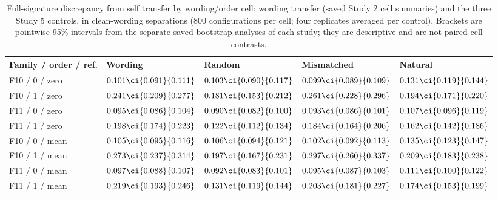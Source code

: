 \begin{table}[H]
\centering\footnotesize
\setlength{\tabcolsep}{3pt}
\caption{Full-signature discrepancy from self transfer by wording/order cell: wording transfer (saved Study 2 cell summaries) and the three Study 5 controls, in clean-wording separations (800 configurations per cell; four replicates averaged per control). Brackets are pointwise 95\% intervals from the separate saved bootstrap analyses of each study; they are descriptive and are not paired cell contrasts.}
\label{tab:null-cell-comparison}
\begin{tabularx}{\linewidth}{@{}lYYYY@{}}
\toprule
Family / order / ref. & Wording & Random & Mismatched & Natural \\
\midrule
F10 / 0 / zero & $0.101\ci{0.091}{0.111}$ & $0.103\ci{0.090}{0.117}$ & $0.099\ci{0.089}{0.109}$ & $0.131\ci{0.119}{0.144}$ \\
F10 / 1 / zero & $0.241\ci{0.209}{0.277}$ & $0.181\ci{0.153}{0.212}$ & $0.261\ci{0.228}{0.296}$ & $0.194\ci{0.171}{0.220}$ \\
F11 / 0 / zero & $0.095\ci{0.086}{0.104}$ & $0.090\ci{0.082}{0.100}$ & $0.093\ci{0.086}{0.101}$ & $0.107\ci{0.096}{0.119}$ \\
F11 / 1 / zero & $0.198\ci{0.174}{0.223}$ & $0.122\ci{0.112}{0.134}$ & $0.184\ci{0.164}{0.206}$ & $0.162\ci{0.142}{0.186}$ \\
F10 / 0 / mean & $0.105\ci{0.095}{0.116}$ & $0.106\ci{0.094}{0.121}$ & $0.102\ci{0.092}{0.113}$ & $0.135\ci{0.123}{0.147}$ \\
F10 / 1 / mean & $0.273\ci{0.237}{0.314}$ & $0.197\ci{0.167}{0.231}$ & $0.297\ci{0.260}{0.337}$ & $0.209\ci{0.183}{0.238}$ \\
F11 / 0 / mean & $0.097\ci{0.088}{0.107}$ & $0.092\ci{0.083}{0.101}$ & $0.095\ci{0.087}{0.103}$ & $0.111\ci{0.100}{0.122}$ \\
F11 / 1 / mean & $0.219\ci{0.193}{0.246}$ & $0.131\ci{0.119}{0.144}$ & $0.203\ci{0.181}{0.227}$ & $0.174\ci{0.153}{0.199}$ \\
\bottomrule
\end{tabularx}
\end{table}

